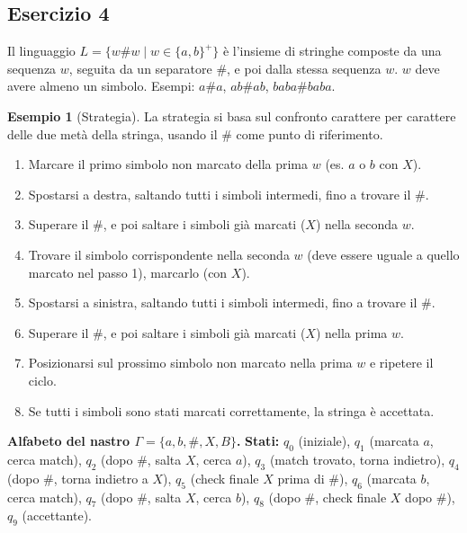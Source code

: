 \documentclass[a4paper]{article}
\theoremstyle{definition} %
\newtheorem{example}{Esempio}
\begin{document}
\subsection{Esercizio 4}
Il linguaggio $L = \{w\#w \mid w \in \{a,b\}^+\}$ è l'insieme di stringhe composte da una sequenza $w$, seguita da un separatore $\#$, e poi dalla stessa sequenza $w$. $w$ deve avere almeno un simbolo. Esempi: $a\#a$, $ab\#ab$, $baba\#baba$.

\begin{example}[Strategia]
La strategia si basa sul confronto carattere per carattere delle due metà della stringa, usando il $\#$ come punto di riferimento.
\begin{enumerate}
    \item Marcare il primo simbolo non marcato della prima $w$ (es. $a$ o $b$ con $X$).
    \item Spostarsi a destra, saltando tutti i simboli intermedi, fino a trovare il $\#$.
    \item Superare il $\#$, e poi saltare i simboli già marcati ($X$) nella seconda $w$.
    \item Trovare il simbolo corrispondente nella seconda $w$ (deve essere uguale a quello marcato nel passo 1), marcarlo (con $X$).
    \item Spostarsi a sinistra, saltando tutti i simboli intermedi, fino a trovare il $\#$.
    \item Superare il $\#$, e poi saltare i simboli già marcati ($X$) nella prima $w$.
    \item Posizionarsi sul prossimo simbolo non marcato nella prima $w$ e ripetere il ciclo.
    \item Se tutti i simboli sono stati marcati correttamente, la stringa è accettata.
\end{enumerate}
\end{example}

\noindent \textbf{Alfabeto del nastro $\Gamma = \{a, b, \#, X, B\}$.}
\noindent \textbf{Stati:} $q_0$ (iniziale), $q_1$ (marcata $a$, cerca match), $q_2$ (dopo $\#$, salta $X$, cerca $a$), $q_3$ (match trovato, torna indietro), $q_4$ (dopo $\#$, torna indietro a $X$), $q_5$ (check finale $X$ prima di $\#$), $q_6$ (marcata $b$, cerca match), $q_7$ (dopo $\#$, salta $X$, cerca $b$), $q_8$ (dopo $\#$, check finale $X$ dopo $\#$), $q_9$ (accettante).
\end{document}
